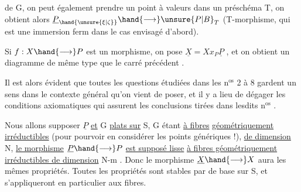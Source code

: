 de G, on peut également prendre un point à valeurs dans un préschéma T,
on obtient alors $\underline{P}_{\hand{\unsure{\xi|\zeta}}} \hand{\longrightarrow} \unsure{P|B}_T$ (T-morphisme, qui est une immersion ferm
dans le cas envisagé d'abord).

Si $f:X \hand{\longrightarrow} P$ est un morphisme, on pose $\underline{X} = Xx_P\underline{P}$ , et on obtient
un diagramme de même type que le carré précédent
.

Il est alors évident que toutes les questions étudiées dans les n$^{\text{os}}$ 2 à 8
gardent un sens dans le contexte général qu'on vient de poser, et il y a
lieu de dégager les conditions axiomatiques qui assurent les conclusions
tirées dans lesdits n$^{\text{os}}$ .

Nous allons supposer $\underline{P}$ \uline{et} G \uline{plats sur} S, G étant \uline{à fibres}
\uline{géométriquement irréductibles} (pour pourvoir en considérer les points
génériques !), \uline{de dimension} N, \uline{le morphisme} $\underline{P} \hand{\longrightarrow} P$ \uline{est supposé lisse}
\uline{à fibres géométriquement irréductibles de dimension} N-m . Donc le
morphisme $\underline{X} \hand{\longrightarrow} X$ aura les mêmes propriétés. Toutes les propriétés
  sont stables par  de base sur S, et s'appliqueront
en particulier aux fibres.

